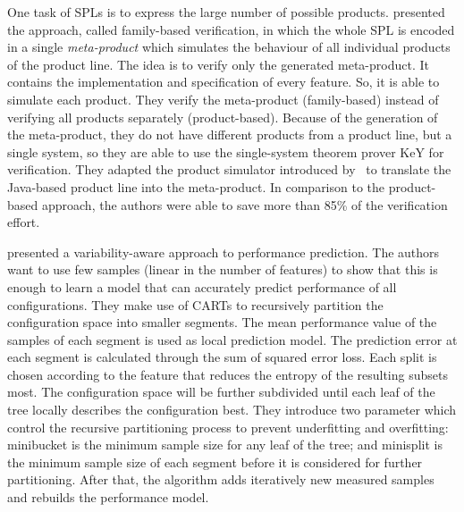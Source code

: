 One task of \acp{SPL} is to express the large number of possible products. \cite{thum2012family} presented the approach, called family-based verification, in which the whole \ac{SPL} is encoded in a single \textit{meta-product} which simulates the behaviour of all individual products of the product line. The idea is to verify only the generated meta-product. It contains the implementation and specification of every feature. So, it is able to simulate each product. They verify the meta-product (family-based) instead of verifying all products separately (product-based). Because of the generation of the meta-product, they do not have different products from a product line, but a single system, so they are able to use the single-system theorem prover KeY for verification. They adapted the product simulator introduced by~\cite{apel2011detection} to translate the Java-based product line into the meta-product. In comparison to the product-based approach, the authors were able to save more than 85\% of the verification effort.

\cite{guo2013variability} presented a variability-aware approach to performance prediction. The authors want to use few samples (linear in the number of features) to show that this is enough to learn a model that can accurately predict performance of all configurations. They make use of \acp{CART} to recursively partition the configuration space into smaller segments. The mean performance value of the samples of each segment is used as local prediction model. The prediction error at each segment is calculated through the sum of squared error loss. Each split is chosen according to the feature that reduces the entropy of the resulting subsets most. The configuration space will be further subdivided until each leaf of the tree locally describes the configuration best. They introduce two parameter which control the recursive partitioning process to prevent underfitting and overfitting: minibucket is the minimum sample size for any leaf of the tree; and minisplit is the minimum sample size of each segment before it is considered for further partitioning. After that, the algorithm adds iteratively new measured samples and rebuilds the performance model.

